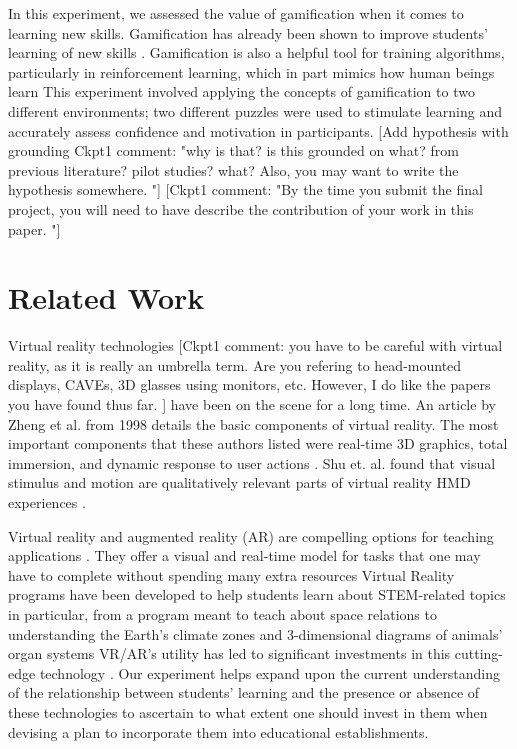 \documentclass[manuscript,screen,review]{acmart}
\begin{document}
In this experiment, we assessed the value of gamification when it comes to learning new skills. Gamification has already been shown to improve students’ learning of new skills \cite{loureiro2020virtual, perez2022can, ausburn2008effects}. Gamification is also a helpful tool for training algorithms, particularly in reinforcement learning, which in part mimics how human beings learn \cite{agostinelli2019solving} This experiment involved applying the concepts of gamification to two different environments; two different puzzles were used to stimulate learning and accurately assess confidence and motivation in participants. [Add hypothesis with grounding Ckpt1 comment: "why is that? is this grounded on what?  from previous literature? pilot studies? what? Also, you may want to write the hypothesis somewhere. "] [Ckpt1 comment: "By the time you submit the final project, you will need to have describe the contribution of your work in this paper. "]

\section{Related Work}
Virtual reality technologies [Ckpt1 comment: you have to be careful with virtual reality, as it is really an umbrella term. Are you refering to head-mounted displays, CAVEs, 3D glasses using monitors, etc. However, I do like the papers you have found thus far. ] have been on the scene for a long time. An article by Zheng et al. \cite{zheng1998virtual} from 1998 details the basic components of virtual reality. The most important components that these authors listed were real-time 3D graphics, total immersion, and dynamic response to user actions \cite{zheng1998virtual}. Shu et. al. found that visual stimulus and motion are qualitatively relevant parts of virtual reality HMD experiences \cite{shu2019do}. 

Virtual reality and augmented reality (AR) are compelling options for teaching applications \cite{mahmoud2020does, brown2019an, bricken1991virtual, villagrasa2014teaching}. They offer a visual and real-time model for tasks that one may have to complete without spending many extra resources \cite{mahmoud2020does} Virtual Reality programs have been developed to help students learn about STEM-related topics in particular, from a program meant to teach about space relations to understanding the Earth’s climate zones and 3-dimensional diagrams of animals’ organ systems \cite{oberdorfer2021mutual} VR/AR’s utility has led to significant investments in this cutting-edge technology \cite{martin2022multimodality, oberdorfer2021mutual}. Our experiment helps expand upon the current understanding of the relationship between students’ learning and the presence or absence of these technologies to ascertain to what extent one should invest in them when devising a plan to incorporate them into educational establishments.
\end{document}
